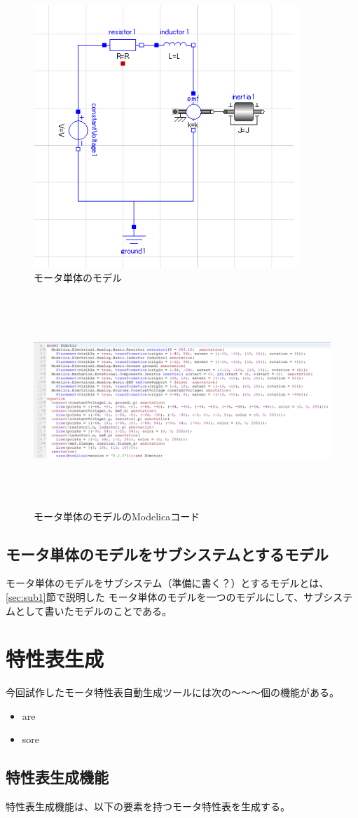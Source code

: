\begin{figure}[t]
  \centering
  \includegraphics[width=10cm]{./Image/tantai_model.png}
  \caption{モータ単体のモデル}
  \label{fig:tantai_model}
\end{figure}

\begin{figure}[t]
	\centering
	\includegraphics[width=16.5cm,height=8cm]{./Image/tantai_modelica.png}
	\caption{モータ単体のモデルのModelicaコード}
	\label{fig:tantai_modelica}
  \end{figure}

\subsection{モータ単体のモデルをサブシステムとするモデル}\label{sec:sub2}
モータ単体のモデルをサブシステム\cite{modelicaシステム本}（準備に書く？）とするモデルとは、\ref{sec:sub1}節で説明した
モータ単体のモデルを一つのモデルにして、サブシステムとして書いたモデルのことである。


\section{特性表生成}\label{kenkyu_mokuteki}
今回試作したモータ特性表自動生成ツールには次の～～～個の機能がある。

\begin{itemize}
	\item are
	\item sore 
\end{itemize}

\subsection{特性表生成機能}\label{sec:tokusei}
特性表生成機能は、以下の要素を持つモータ特性表を生成する。

